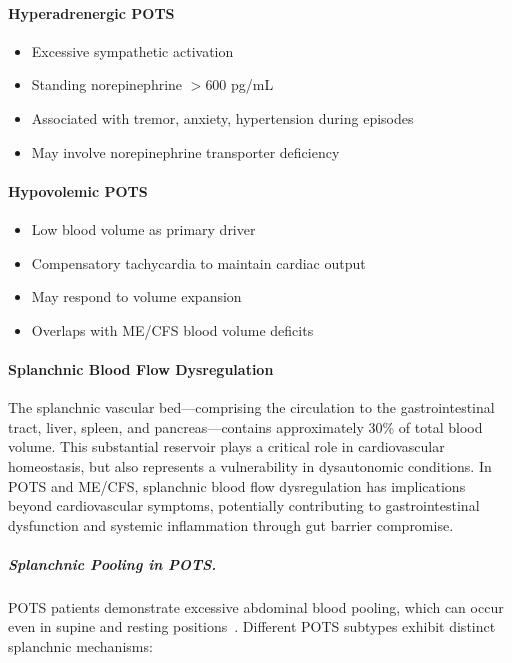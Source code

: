 \paragraph{Hyperadrenergic POTS}
\begin{itemize}
    \item Excessive sympathetic activation~\cite{Raj2005}
    \item Standing norepinephrine $>$600 pg/mL
    \item Associated with tremor, anxiety, hypertension during episodes
    \item May involve norepinephrine transporter deficiency
\end{itemize}

\paragraph{Hypovolemic POTS}
\begin{itemize}
    \item Low blood volume as primary driver~\cite{Raj2005,Stewart2006}
    \item Compensatory tachycardia to maintain cardiac output
    \item May respond to volume expansion
    \item Overlaps with ME/CFS blood volume deficits
\end{itemize}

\paragraph{Splanchnic Blood Flow Dysregulation}

The splanchnic vascular bed---comprising the circulation to the gastrointestinal tract, liver, spleen, and pancreas---contains approximately 30\% of total blood volume. This substantial reservoir plays a critical role in cardiovascular homeostasis, but also represents a vulnerability in dysautonomic conditions. In POTS and ME/CFS, splanchnic blood flow dysregulation has implications beyond cardiovascular symptoms, potentially contributing to gastrointestinal dysfunction and systemic inflammation through gut barrier compromise.

\subparagraph{Splanchnic Pooling in POTS.}
POTS patients demonstrate excessive abdominal blood pooling, which can occur even in supine and resting positions~\cite{terSteege2012}. Different POTS subtypes exhibit distinct splanchnic mechanisms:

